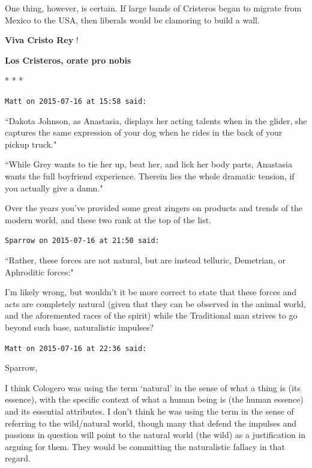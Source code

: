 One thing, however, is certain. If large bands of Cristeros began to migrate from Mexico to the USA, then liberals would be clamoring to build a wall.

\textbf{Viva Cristo Rey} !

\textbf{Los Cristeros, orate pro nobis}




\begin{center}* * *\end{center}

\begin{footnotesize}\begin{sffamily}



\texttt{Matt on 2015-07-16 at 15:58 said: }

``Dakota Johnson, as Anastasia, displays her acting talents when in the glider, she captures the same expression of your dog when he rides in the back of your pickup truck."

``While Grey wants to tie her up, beat her, and lick her body parts, Anastasia wants the full boyfriend experience. Therein lies the whole dramatic tension, if you actually give a damn."

Over the years you've provided some great zingers on products and trends of the modern world, and these two rank at the top of the list.


\hfill

\texttt{Sparrow on 2015-07-16 at 21:50 said: }

``Rather, these forces are not natural, but are instead telluric, Demetrian, or Aphroditic forces:"

I'm likely wrong, but wouldn't it be more correct to state that these forces and acts are completely natural (given that they can be observed in the animal world, and the aforemented races of the spirit) while the Traditional man strives to go beyond such base, naturalistic impulses?


\hfill

\texttt{Matt on 2015-07-16 at 22:36 said: }

Sparrow,

I think Cologero was using the term `natural' in the sense of what a thing is (its essence), with the specific context of what a human being is (the human essence) and its essential attributes. I don't think he was using the term in the sense of referring to the wild/natural world, though many that defend the impulses and passions in question will point to the natural world (the wild) as a justification in arguing for them. They would be committing the naturalistic fallacy in that regard.


\end{sffamily}
\end{footnotesize}
